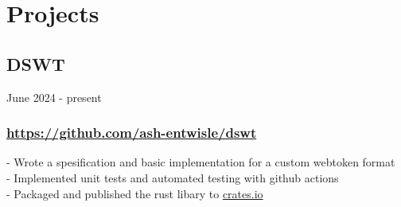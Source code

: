\newpage

\section{Projects}



\subsection{DSWT} June 2024 - present \\
\subsubsection{\href{https://github.com/ash-entwisle/dswt}{https://github.com/ash-entwisle/dswt} }
-\:  Wrote a spesification and basic implementation for a custom webtoken format \\
-\:  Implemented unit tests and automated testing with github actions \\
-\:  Packaged and published the rust libary to \href{https://crates.io/}{crates.io} \\ 


